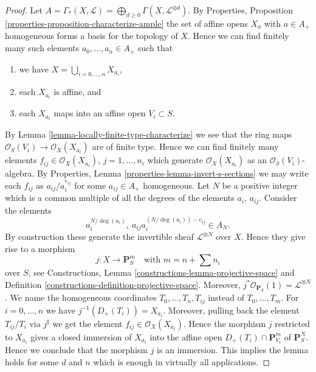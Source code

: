\documentclass[10pt,a4paper]{amsart}
\theoremstyle{plain}
\theoremstyle{definition}
\theoremstyle{remark}
\numberwithin{equation}{subsection}
\begin{document}
\begin{proof}
Let
$A = \Gamma_*(X, \mathcal{L}) =
\bigoplus_{d \geq 0} \Gamma(X, \mathcal{L}^{\otimes d})$.
By Properties, Proposition \ref{properties-proposition-characterize-ample}
the set of affine opens $X_a$ with $a \in A_{+}$ homogeneous forms
a basis for the topology of $X$. Hence we can find finitely
many such elements $a_0, \ldots, a_n \in A_{+}$ such that
\begin{enumerate}
\item we have $X = \bigcup_{i = 0, \ldots, n} X_{a_i}$,
\item each $X_{a_i}$ is affine, and
\item each $X_{a_i}$ maps into an affine open $V_i \subset S$.
\end{enumerate}
By Lemma \ref{lemma-locally-finite-type-characterize}
we see that the ring maps
$\mathcal{O}_S(V_i) \to \mathcal{O}_X(X_{a_i})$ are
of finite type. Hence we can find finitely many
elements $f_{ij} \in \mathcal{O}_X(X_{a_i})$, $j = 1, \ldots, n_i$
which generate $\mathcal{O}_X(X_{a_i})$ as an $\mathcal{O}_S(V_i)$-algebra.
By Properties, Lemma \ref{properties-lemma-invert-s-sections}
we may write each
$f_{ij}$ as $a_{ij}/a_i^{e_{ij}}$ for some
$a_{ij} \in A_{+}$ homogeneous. Let $N$ be a positive integer which
is a common multiple of all the degrees of the elements
$a_i$, $a_{ij}$. Consider the elements
$$
a_i^{N/\deg(a_i)}, \ a_{ij}a_i^{(N/\deg(a_i)) - e_{ij}} \in A_N.
$$
By construction these generate the invertible sheaf
$\mathcal{L}^{\otimes N}$ over $X$. Hence they give rise
to a morphism
$$
j : X \longrightarrow
\mathbf{P}_S^{m}
\quad
\text{with } m = n + \sum n_i
$$
over $S$, see Constructions, Lemma \ref{constructions-lemma-projective-space}
and Definition \ref{constructions-definition-projective-space}.
Moreover, $j^*\mathcal{O}_{\mathbf{P}_S}(1) = \mathcal{L}^{\otimes N}$.
We name the homogeneous coordinates $T_0, \ldots, T_n, T_{ij}$
instead of $T_0, \ldots, T_m$.
For $i = 0, \ldots, n$ we have $j^{-1}(D_{+}(T_i)) = X_{a_i}$.
Moreover, pulling back the element $T_{ij}/T_i$ via $j^\sharp$ we
get the element $f_{ij} \in \mathcal{O}_X(X_{a_i})$.
Hence the morphism $j$ restricted to $X_{a_i}$
gives a closed immersion of $X_{a_i}$ into the affine open
$D_{+}(T_i) \cap \mathbf{P}^m_{V_i}$ of $\mathbf{P}^N_S$.
Hence we conclude that the morphism $j$ is an immersion.
This implies the lemma holds for some $d$ and $n$ which is enough
in virtually all applications.


\end{proof}
\end{document}
